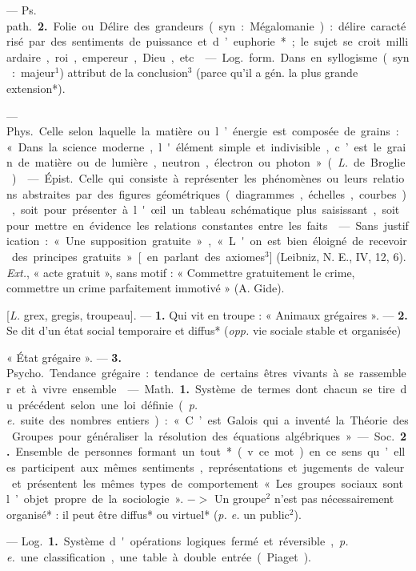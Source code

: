 \begin{itemize}[leftmargin=1cm, label=, itemsep=1pt]
— \si{Ps. path.} {\bf 2.} Folie ou Délire
des grandeurs (syn. : Mégalomanie) :
délire caractérisé par des sentiments de puissance et d’euphorie*;
le sujet se croit milliardaire, roi,
empereur, Dieu, etc.

 — \si{Log.} \si{form.} Dans en
syllogisme (syn. : majeur$^1$) attribut
de la conclusion$^3$ (parce qu'il a
gén. la plus grande extension*).

 — \si{Phys.} Celle
selon laquelle la matière ou l’énergie
est composée de grains : « Dans la
science moderne, l'élément simple
et indivisible, c’est le grain de matière ou de lumière, neutron, électron ou photon » ({\it L.} de Broglie).

 — \si{Épist.} Celle
qui consiste à représenter les phénomènes
ou leurs relations abstraites
par des figures géométriques (diagrammes, échelles, courbes), soit
pour présenter à l'œil un tableau
schématique plus saisissant, soit
pour mettre en évidence les relations constantes entre les faits.

 — Sans justification : « Une
supposition gratuite », « L'on est
bien éloigné de recevoir des principes gratuits » [en parlant des
axiomes$^3$] (Leibniz, N. E., IV, 12, 6).
{\it Ext.}, « acte gratuit », sans motif :
« Commettre gratuitement le crime,
commettre un crime parfaitement
immotivé » (A. Gide).

 [{\it L.} grex, gregis, troupeau].
— {\bf 1.} Qui vit en troupe : « Animaux
grégaires ». — {\bf 2.} Se dit d’un état
social temporaire et diffus* ({\it opp.}
vie sociale stable et organisée)

« État grégaire ». — {\bf 3.} \si{Psycho.} Tendance grégaire : tendance de certains êtres vivants à se rassembler
et à vivre ensemble.

 — \si{Math.} {\bf 1.} Système de termes
dont chacun se tire du précédent
selon une loi définie ({\it p. e.} suite des
nombres entiers) : « C’est Galois qui
a inventé la Théorie des Groupes
pour généraliser la résolution des
équations algébriques. » — \si{Soc.}
 {\bf 2.} Ensemble de personnes formant
un tout* (v. ce mot) en ce sens
qu’elles participent aux mêmes sentiments, représentations et jugements de valeur et présentent les
mêmes types de comportement
« Les groupes sociaux sont l’objet
propre de la sociologie ». $->$ Un
groupe$^2$ n'est pas nécessairement
organisé* : il peut être diffus* ou
virtuel* ({\it p. e.} un public$^2$).

 — \si{Log.} {\bf 1.} Système d'opérations logiques fermé et réversible,
{\it p. e.} une classification, une table à
double entrée (Piaget).


\end{itemize}
